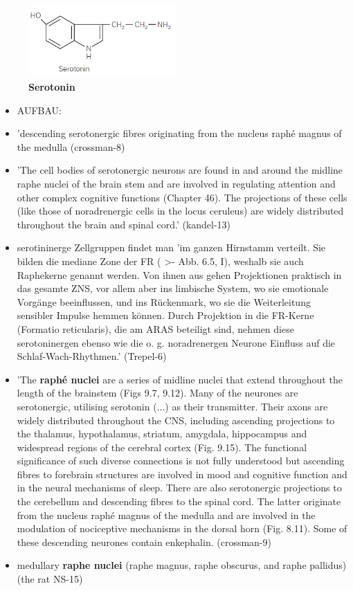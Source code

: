 \documentclass[12pt,a4paper,pdftex]{article}
\begin{document}
\begin{figure}[H]
    \centering
    \includegraphics[width=0.5\textwidth]{pictures/Bilder_monoamine_systeme/serotonin.PNG}
    \caption{\textbf{Serotonin} \textsuperscript{\cite[13]{kandel2013principles}}}
    \label{fig:serotonin}
\end{figure}{}

\begin{itemize}{}
    \item AUFBAU:
    \item 'descending serotonergic fibres originating from the nucleus raphé magnus of the medulla (crossman-8)
    \item 'The cell bodies of serotonergic neurons are found in and around the midline raphe nuclei of the brain stem and are involved in regulating attention and other complex cognitive functions (Chapter 46). The projections of these cells (like those of noradrenergic cells in the locus ceruleus) are widely distributed throughout the brain and spinal cord.' (kandel-13)
    \item serotininerge Zellgruppen findet man 'im ganzen Hirnstamm verteilt. Sie bilden die mediane Zone der FR ( >- Abb. 6.5, I), weshalb sie auch Raphekerne genannt werden. Von ihnen aus gehen Projektionen praktisch in das gesamte ZNS, vor allem aber ins limbische System, wo sie emotionale Vorgänge beeinflussen, und ins Rückenmark, wo sie die Weiterleitung sensibler Impulse hemmen können. Durch Projektion in die FR-Kerne (Formatio reticularis), die am ARAS beteiligt sind, nehmen diese serotoninergen ebenso wie die o. g. noradrenergen Neurone Einfluss auf die Schlaf-Wach-Rhythmen.' (Trepel-6)
    \item 'The \textbf{raphé nuclei} are a series of midline nuclei that extend throughout the length of the brainstem (Figs 9.7, 9.12). Many of the neurones are serotonergic, utilising serotonin (...) as their transmitter. Their axons are widely distributed throughout the CNS, including ascending projections to the thalamus, hypothalamus, striatum, amygdala, hippocampus and widespread regions of the cerebral cortex (Fig. 9.15). The functional significance of such diverse connections is not fully understood but ascending fibres to forebrain structures are involved in mood and cognitive function and in the neural mechanisms of sleep. There are also serotonergic projections to the cerebellum and descending fibres to the spinal cord. The latter originate from the nucleus raphé magnus of the medulla and are involved in the modulation of nociceptive mechanisms in the dorsal horn (Fig. 8.11). Some of these descending neurones contain enkephalin. (crossman-9)
    \item medullary \textbf{raphe nuclei} (raphe magnus, raphe obscurus, and raphe pallidus) (the rat NS-15)
\end{itemize}
    
\end{document}
